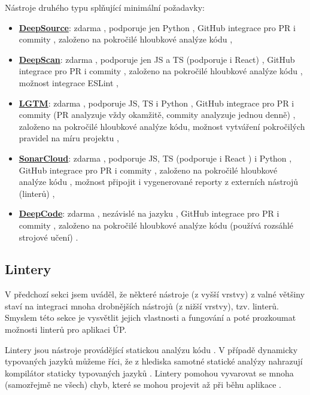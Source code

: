 Nástroje druhého typu splňující minimální požadavky:
\begin{itemize}
    \item \href{https://deepsource.io/}{\textbf{DeepSource}}: zdarma \cite{deepsource}, podporuje jen Python \cite{deepsource}, GitHub integrace pro PR i commity \cite{deepsource-docs}, založeno na pokročilé hloubkové analýze kódu \cite{deepsource2},
    \item \href{https://deepscan.io}{\textbf{DeepScan}}: zdarma \cite{deepscan-pricing}, podporuje jen JS a TS (podporuje i React) \cite{deepscan}, GitHub integrace pro PR i commity \cite{deepscan}, založeno na pokročilé hloubkové analýze kódu \cite{deepscan}, možnost integrace ESLint \cite{deepscan-eslint},
    \item \href{https://lgtm.com}{\textbf{LGTM}}: zdarma \cite{lgtm}, podporuje JS, TS i Python \cite{lgtm-faq}, GitHub integrace pro PR i commity (PR analyzuje vždy okamžitě, commity analyzuje jednou denně) \cite{lgtm-faq}, založeno na pokročilé hloubkové analýze kódu, možnost vytváření pokročilých pravidel na míru projektu \cite{lgtm},
    \item \href{https://sonarcloud.io/}{\textbf{SonarCloud}}: zdarma \cite{sonarcloud}, podporuje JS, TS (podporuje i React \cite{sonarcloud-js}) i Python \cite{sonarcloud}, GitHub integrace pro PR i commity \cite{sonarcloud-gh}, založeno na pokročilé hloubkové analýze kódu \cite{sonarcloud2}, možnost připojit i vygenerované reporty z externích nástrojů (linterů) \cite{sonarcloud-engines},
    \item \href{https://www.deepcode.ai/}{\textbf{DeepCode}}: zdarma \cite{deepcode}, nezávislé na jazyku \cite{deepsource2}, GitHub integrace pro PR i commity \cite{deepcode}, založeno na pokročilé hloubkové analýze kódu (používá rozsáhlé strojové učení) \cite{deepcode2}.
\end{itemize}

\subsection{Lintery}\label{lintery}

V předchozí sekci jsem uváděl, že některé nástroje (z vyšší vrstvy) z valné většiny staví na integraci mnoha drobnějších nástrojů (z nižší vrstvy), tzv. linterů. Smyslem této sekce je vysvětlit jejich vlastnosti a fungování a poté prozkoumat možnosti linterů pro aplikaci ÚP. 

Lintery jsou nástroje provádějící statickou analýzu kódu \cite{linter-medium1}. V případě dynamicky typovaných jazyků můžeme říci, že z hlediska samotné statické analýzy nahrazují kompilátor staticky typovaných jazyků \cite{linter-medium1}. Lintery pomohou vyvarovat se mnoha (samozřejmě ne všech) chyb, které se mohou projevit až při běhu aplikace \cite{linter-medium1}.

